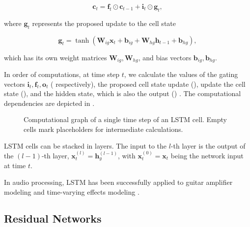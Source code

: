 \begin{equation}
  \pmb{c}_t = \pmb{f}_t \odot \pmb{c}_{t-1} + \pmb{i}_t \odot \pmb{g}_t,
  \label{eq:lstm_cell_update}
\end{equation}

where $\pmb{g}_t$ represents the proposed update to the cell state

\begin{equation}
  \pmb{g}_t = \tanh (\pmb{W}_{ig} \pmb{x}_t + \pmb{b}_{ig} + \pmb{W}_{hg} \pmb{h}_{t-1} + \pmb{b}_{hg}),
  \label{eq:lstm_proposed_update}
\end{equation}

which has its own weight matrices $\pmb{W}_{ig}, \pmb{W}_{hg}$, and bias vectors $\pmb{b}_{ig}, \pmb{b}_{hg}$.

In order of computations, at time step $t$, we calculate the values of the gating vectors $\pmb{i}_t, \pmb{f}_t, \pmb{o}_t$ ( respectively), the proposed cell state update (), update the cell state (), and the hidden state, which is also the output () \cite{Pytorch}. The computational dependencies are depicted in .

\begin{figure}
  \centering
  \def\svgwidth{\columnwidth}
  
  \caption{Computational graph of a single time step of an \ac{LSTM} cell. Empty cells mark placeholders for intermediate calculations.}
  \label{fig:lstm_memory_cell}
\end{figure}

\ac{LSTM} cells can be stacked in layers. The input to the $l$-th layer is the output of the $(l-1)$-th layer, $\pmb{x}_t^{(l)} = \pmb{h}_y^{(l-1)}$, with $\pmb{x}_t^{(0)} = \pmb{x}_t$ being the network input at time $t$.


In audio processing, \ac{LSTM} has been successfully applied to guitar amplifier modeling \cite{Wright2019,Wrightetal2020} and time-varying effects modeling \cite{Wright2020}.

\subsection*{Residual Networks}

